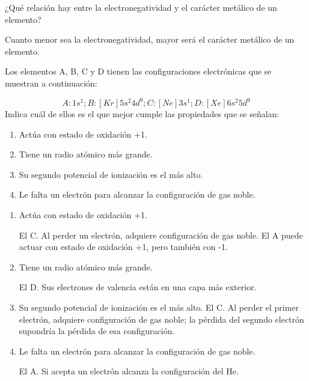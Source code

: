 \begin{question}
    ¿Qué relación hay entre la electronegatividad y el carácter
    metálico de un elemento?


    \begin{solu}
        Cuanto menor sea la electronegatividad, mayor será el carácter
        metálico de un elemento.
    \end{solu}

\end{question}

\begin{question}
    Los elementos A, B, C y D tienen las configuraciones
    electrónicas que se muestran a continuación:

    \begin{equation*}
        A: 1s^1; B: [Kr] 5s^2 4d^9; C: [Ne]3s^1; D:[Xe]6s^2 5d^9
    \end{equation*}
    Indica cuál de ellos es el que mejor cumple las propiedades
    que se señalan:
    \begin{enumerate}[label=\letraminuscula]
    \item  Actúa con estado de oxidación +1.
    \item Tiene un radio atómico más grande.
    \item Su segundo potencial de ionización es el más alto.
    \item Le falta un electrón para alcanzar la configuración
    de gas noble.
    \end{enumerate}

    \begin{solu}
        \begin{enumerate}[label=\letraminuscula]
            \item  Actúa con estado de oxidación +1.

            El C. Al perder un electrón, adquiere configuración de
            gas noble. El A puede actuar con estado de oxidación +1,
            pero también con -1.

            \item Tiene un radio atómico más grande.

            El D. Sus electrones de valencia están en una capa más
            exterior.

            \item Su segundo potencial de ionización es el más alto.
            El C. Al perder el primer electrón, adquiere configuración
            de gas noble; la pérdida del segundo electrón supondría
            la pérdida de esa configuración.

            \item Le falta un electrón para alcanzar la configuración
            de gas noble.

            El A. Si acepta un electrón alcanza la configuración del
            He.

        \end{enumerate}
    \end{solu}
\end{question}

